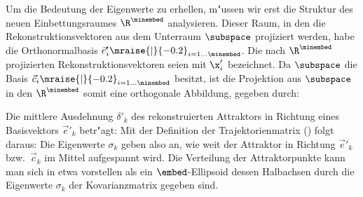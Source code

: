 Um die Bedeutung der Eigenwerte zu erhellen, m"ussen wir erst die Struktur des neuen
Einbettungsraumes $\R^\minembed$ analysieren. Dieser Raum, in den die Rekonstruktionsvektoren aus
dem Unterraum $\subspace$ projiziert werden, habe die Orthonormalbasis $\vec
e'_i\mraise{\rvert}{-0.2}_{i=1\dots\minembed}$. Die nach $\R^\minembed$ projizierten
Rekonstruktionsvektoren  seien mit $\x'_i$ bezeichnet. Da $\subspace$ die Basis $\vec
c_i\mraise{\rvert}{-0.2}_{i=1\dots\minembed}$ besitzt, ist die Projektion aus $\subspace$ in
den $\R^\minembed$ somit eine orthogonale Abbildung, gegeben durch:


Die mittlere Ausdehnung $\delta'_k$ des rekonstruierten Attraktors in Richtung eines Basisvektors
$\vec e'_k$ betr"agt:
Mit der  Definition der Trajektorienmatrix () folgt daraus:
Die Eigenwerte $\sigma_k$ geben also an, wie weit der Attraktor in Richtung $\vec e'_k$ bzw.\  $\vec c_k$
im Mittel aufgespannt wird. Die Verteilung der Attraktorpunkte kann man sich in etwa vorstellen als ein
$\embed$-Ellipsoid dessen Halbachsen durch die Eigenwerte $\sigma_k$ der Kovarianzmatrix
gegeben sind. 

